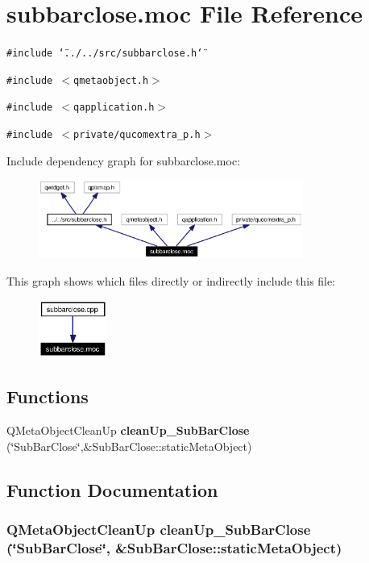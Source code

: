 \section{subbarclose.moc File Reference}
\label{subbarclose_8moc}


{\tt \#include \char`\"{}../../src/subbarclose.h\char`\"{}}\par
{\tt \#include $<$qmetaobject.h$>$}\par
{\tt \#include $<$qapplication.h$>$}\par
{\tt \#include $<$private/qucomextra\_\-p.h$>$}\par


Include dependency graph for subbarclose.moc:\begin{figure}[H]
\begin{center}
\leavevmode
\includegraphics[width=246pt]{subbarclose_8moc__incl}
\end{center}
\end{figure}


This graph shows which files directly or indirectly include this file:\begin{figure}[H]
\begin{center}
\leavevmode
\includegraphics[width=64pt]{subbarclose_8moc__dep__incl}
\end{center}
\end{figure}
\subsection*{Functions}
\begin{CompactItemize}
\item 
QMeta\-Object\-Clean\-Up {\bf clean\-Up\_\-Sub\-Bar\-Close} (\char`\"{}Sub\-Bar\-Close\char`\"{},\&Sub\-Bar\-Close::static\-Meta\-Object)
\end{CompactItemize}


\subsection{Function Documentation}
\subsubsection{\setlength{\rightskip}{0pt plus 5cm}QMeta\-Object\-Clean\-Up clean\-Up\_\-Sub\-Bar\-Close (\char`\"{}Sub\-Bar\-Close\char`\"{}, \&Sub\-Bar\-Close::static\-Meta\-Object)\hspace{0.3cm}{\tt  [static]}}\label{subbarclose_8moc_a0}


